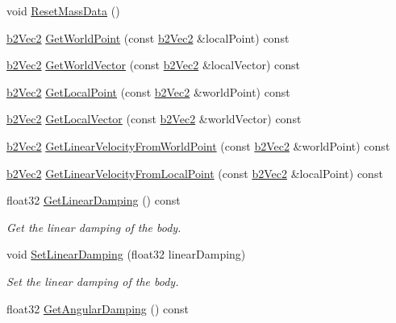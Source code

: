 \begin{DoxyCompactItemize}
void \hyperlink{classb2_body_a109d8567c6ae84c61fce2919fb209c63}{Reset\+Mass\+Data} ()
\item 
\hyperlink{structb2_vec2}{b2\+Vec2} \hyperlink{classb2_body_a8055b90bccb51383caa8c42fbc96c9c3}{Get\+World\+Point} (const \hyperlink{structb2_vec2}{b2\+Vec2} \&local\+Point) const 
\item 
\hyperlink{structb2_vec2}{b2\+Vec2} \hyperlink{classb2_body_afd44622669b5e45202c23e4a212895fc}{Get\+World\+Vector} (const \hyperlink{structb2_vec2}{b2\+Vec2} \&local\+Vector) const 
\item 
\hyperlink{structb2_vec2}{b2\+Vec2} \hyperlink{classb2_body_a8f9ef0226b7eb989e700fa8898d29fc0}{Get\+Local\+Point} (const \hyperlink{structb2_vec2}{b2\+Vec2} \&world\+Point) const 
\item 
\hyperlink{structb2_vec2}{b2\+Vec2} \hyperlink{classb2_body_a93de09565c0c1a9da2601c1847aa22df}{Get\+Local\+Vector} (const \hyperlink{structb2_vec2}{b2\+Vec2} \&world\+Vector) const 
\item 
\hyperlink{structb2_vec2}{b2\+Vec2} \hyperlink{classb2_body_a4238ae43f5afeb2126b8e8bf765334b5}{Get\+Linear\+Velocity\+From\+World\+Point} (const \hyperlink{structb2_vec2}{b2\+Vec2} \&world\+Point) const 
\item 
\hyperlink{structb2_vec2}{b2\+Vec2} \hyperlink{classb2_body_a4429e3f380e882def11c52ac893b8e2e}{Get\+Linear\+Velocity\+From\+Local\+Point} (const \hyperlink{structb2_vec2}{b2\+Vec2} \&local\+Point) const 
\item 
float32 \hyperlink{classb2_body_a7283e4821d24aed0fa5b0f7891175183}{Get\+Linear\+Damping} () const \hypertarget{classb2_body_a7283e4821d24aed0fa5b0f7891175183}{}\label{classb2_body_a7283e4821d24aed0fa5b0f7891175183}

\begin{DoxyCompactList}\small\item\em Get the linear damping of the body. \end{DoxyCompactList}\item 
void \hyperlink{classb2_body_a909f9753ad700f70282a56e00bc182a5}{Set\+Linear\+Damping} (float32 linear\+Damping)\hypertarget{classb2_body_a909f9753ad700f70282a56e00bc182a5}{}\label{classb2_body_a909f9753ad700f70282a56e00bc182a5}

\begin{DoxyCompactList}\small\item\em Set the linear damping of the body. \end{DoxyCompactList}\item 
float32 \hyperlink{classb2_body_a5153143f2593802c85e54a21de5464ce}{Get\+Angular\+Damping} () const \hypertarget{classb2_body_a5153143f2593802c85e54a21de5464ce}{}\label{classb2_body_a5153143f2593802c85e54a21de5464ce}


\end{DoxyCompactItemize}
